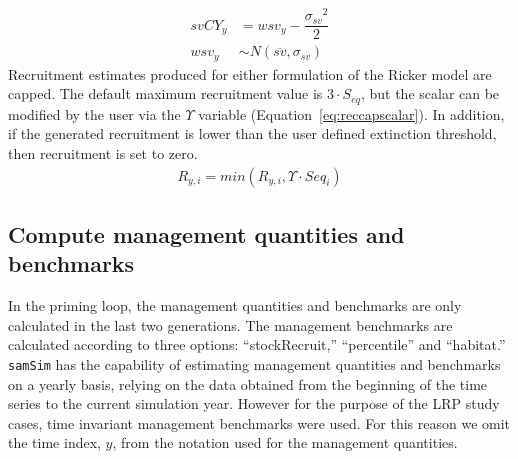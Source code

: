 \documentclass[11pt]{book}
\begin{document}
\begin{align}
  svCY_{y} &= wsv_{y} - \dfrac{{\sigma_{sv}}^2}{2}\\
  wsv_{y} &\sim N(\overline{sv},\sigma_{sv})
  \label{eq:survCY}
\end{align}
Recruitment estimates produced for either formulation of the Ricker model are capped. The default maximum recruitment value is \(3 \cdot S_{eq}\), but the scalar can be modified by the user via the \(\Upsilon\) variable (Equation~\ref{eq:reccapscalar}). In addition, if the generated recruitment is lower than the user defined extinction threshold, then recruitment is set to zero.
\begin{align}
  R_{y,i} = min(R_{y,i}, \Upsilon \cdot Seq_{i})
  \label{eq:reccapscalar}
\end{align}
\hypertarget{compute-management-quantities-and-benchmarks}{%
\subsection{Compute management quantities and benchmarks}\label{compute-management-quantities-and-benchmarks}}

In the priming loop, the management quantities and benchmarks are only calculated in the last two generations. The management benchmarks are calculated according to three options: ``stockRecruit,'' ``percentile'' and ``habitat.'' \texttt{samSim} has the capability of estimating management quantities and benchmarks on a yearly basis, relying on the data obtained from the beginning of the time series to the current simulation year. However for the purpose of the LRP study cases, time invariant management benchmarks were used. For this reason we omit the time index, \(y\), from the notation used for the management quantities.
\end{document}
